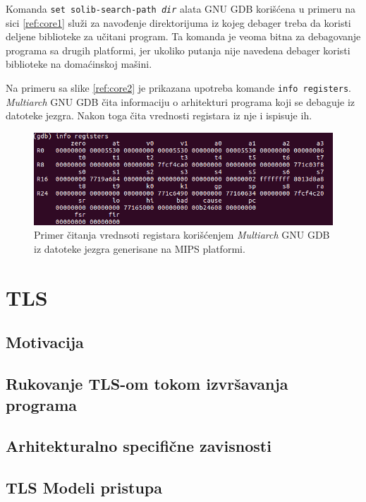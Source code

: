 \documentclass[12pt,oneside]{memoir}
\begin{document}
Komanda \texttt{set solib-search-path \emph{dir}} alata GNU GDB korišćena u primeru na sici \ref{ref:core1} služi za navođenje direktorijuma iz kojeg debager treba da koristi deljene biblioteke za učitani program. Ta komanda je veoma bitna za debagovanje programa sa drugih platformi, jer ukoliko putanja nije navedena debager koristi biblioteke na domaćinskoj mašini.

Na primeru sa slike \ref{ref:core2} je prikazana upotreba komande \texttt{info registers}. \emph{Multiarch} GNU GDB čita informaciju o arhitekturi programa koji se debaguje iz datoteke jezgra. Nakon toga čita vrednosti registara iz nje i ispisuje ih.

\begin{figure}[h!]
	\begin{center}
		\includegraphics[scale=0.5]{slike/core2.png}
	\end{center}
	\caption{Primer čitanja vrednsoti registara korišćenjem \emph{Multiarch} GNU GDB iz datoteke jezgra generisane na MIPS platformi.}
	\label{fig:core2}
\end{figure}

\chapter{TLS}
\label{chp:TLS}


\section{Motivacija}
\section{Rukovanje TLS-om tokom izvršavanja programa}
\section{Arhitekturalno specifične zavisnosti}
\section{TLS Modeli pristupa}
\end{document}
